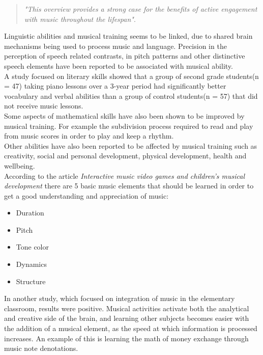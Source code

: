 	\begin{quote}
		\textit{"This overview provides a strong case for the benefits of active engagement with music throughout the lifespan"}\cite{powerOfMusic}\label{quote:powerOfMusic}.\\
	\end{quote}
	
	Linguistic abilities and musical training seems to be linked, due to shared brain mechanisms being used to process music and language. Precision in the perception of speech related contrasts, in pitch patterns and other distinctive speech elements have been reported to be associated with musical ability\cite{languageSkills}.\\
	
	A study focused on literary skills showed that a group of second grade students(n = 47) taking piano lessons over a 3-year period had significantly better vocabulary and verbal abilities than a group of control students(n = 57) that did not receive music lessons\cite{vocabularySkills}.\\
	
	Some aspects of mathematical skills have also been shown to be improved by musical training. For example the subdivision process required to read and play from music scores in order to play and keep a rhythm\cite{powerOfMusic}.\\
	
	Other abilities have also been reported to be affected by musical training such as creativity, social and personal development, physical development, health and wellbeing\cite{powerOfMusic}.\\
	
	According to the article \textit{Interactive music video games and children's musical development} there are 5 basic music elements that should be learned in order to get a good understanding and appreciation of music\cite[p.~99]{interactiveMusicVideoGames}:
	\begin{itemize}\label{list:basicMusic}
		\item Duration
		\item Pitch
		\item Tone color
		\item Dynamics
		\item Structure\\
	\end{itemize}
	
	In another study, which focused on integration of music in the elementary classroom, results were positive. Musical activities activate both the analytical and creative side of the brain, and learning other subjects becomes easier with the addition of a musical element, as the speed at which information is processed increases. An example of this is learning the math of money exchange through music note denotations\cite{musicIntegration}.\\
	
